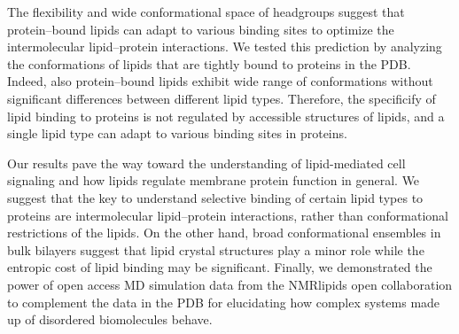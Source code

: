 \documentclass[aps,prl,superscriptaddress,twocolumn]{revtex4}
\begin{document}
The flexibility and wide conformational space of headgroups suggest that protein--bound lipids can
adapt to various binding sites to optimize the intermolecular lipid--protein interactions.
We tested this prediction by analyzing the conformations of lipids that are tightly bound to proteins in the PDB.
Indeed, also protein--bound lipids exhibit wide range of conformations without significant 
differences between different lipid types. Therefore, the specificify of lipid binding to proteins is not
regulated by accessible structures of lipids, and a single lipid type can adapt to various binding sites in proteins.

Our results pave the way toward the understanding of lipid-mediated cell signaling and how lipids regulate membrane protein function in general.
We suggest that the key to understand selective binding of certain lipid types to proteins
are intermolecular lipid--protein interactions, rather than conformational restrictions of the lipids.
On the other hand, broad conformational ensembles in bulk bilayers suggest that lipid crystal structures
play a minor role while the entropic cost of lipid binding may be significant.
Finally, we demonstrated the power of open access MD simulation data from the NMRlipids open collaboration
to complement the data in the PDB for elucidating how complex systems made up of disordered biomolecules behave.
\end{document}
